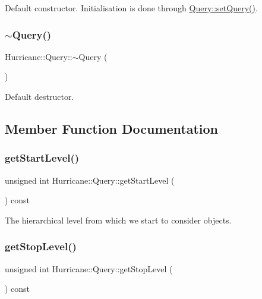 Default constructor. Initialisation is done through \mbox{\hyperlink{classHurricane_1_1Query_a70fce1e5b7754f1ec11097ad5b9ecfc9}{Query\+::set\+Query()}}. \mbox{\label{classHurricane_1_1Query_acd18d98c6bf30dd049916508a397391a}} 
\subsubsection{\texorpdfstring{$\sim$\+Query()}{~Query()}}
{\footnotesize\ttfamily Hurricane\+::\+Query\+::$\sim$\+Query (\begin{DoxyParamCaption}{ }\end{DoxyParamCaption})\hspace{0.3cm}{\ttfamily [virtual]}}

Default destructor. 

\subsection{Member Function Documentation}
\mbox{\label{classHurricane_1_1Query_a7aac7fbdc96df19e7249bf8993eb355f}} 
\subsubsection{\texorpdfstring{get\+Start\+Level()}{getStartLevel()}}
{\footnotesize\ttfamily unsigned int Hurricane\+::\+Query\+::get\+Start\+Level (\begin{DoxyParamCaption}{ }\end{DoxyParamCaption}) const\hspace{0.3cm}{\ttfamily [inline]}}

The hierarchical level from which we start to consider objects. \mbox{\label{classHurricane_1_1Query_a3544d22dbb0685208c590cef09412796}} 
\subsubsection{\texorpdfstring{get\+Stop\+Level()}{getStopLevel()}}
{\footnotesize\ttfamily unsigned int Hurricane\+::\+Query\+::get\+Stop\+Level (\begin{DoxyParamCaption}{ }\end{DoxyParamCaption}) const\hspace{0.3cm}{\ttfamily [inline]}}


